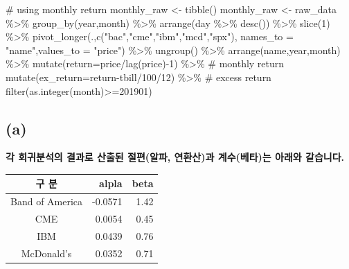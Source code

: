 \documentclass[
  a4paper,
  DIV=11,
  numbers=noendperiod]{scrreprt}
\newenvironment{Shaded}{\begin{snugshade}}{\end{snugshade}}
\newcommand{\AttributeTok}[1]{\textcolor[rgb]{0.40,0.45,0.13}{#1}}
\newcommand{\CommentTok}[1]{\textcolor[rgb]{0.37,0.37,0.37}{#1}}
\newcommand{\DecValTok}[1]{\textcolor[rgb]{0.68,0.00,0.00}{#1}}
\newcommand{\FunctionTok}[1]{\textcolor[rgb]{0.28,0.35,0.67}{#1}}
\newcommand{\NormalTok}[1]{\textcolor[rgb]{0.00,0.23,0.31}{#1}}
\newcommand{\OtherTok}[1]{\textcolor[rgb]{0.00,0.23,0.31}{#1}}
\newcommand{\SpecialCharTok}[1]{\textcolor[rgb]{0.37,0.37,0.37}{#1}}
\newcommand{\StringTok}[1]{\textcolor[rgb]{0.13,0.47,0.30}{#1}}
\begin{document}
\begin{Shaded}
\begin{Highlighting}[]
\CommentTok{\# using monthly return}
\NormalTok{monthly\_raw }\OtherTok{\textless{}{-}} \FunctionTok{tibble}\NormalTok{()}
\NormalTok{monthly\_raw }\OtherTok{\textless{}{-}}\NormalTok{ raw\_data }\SpecialCharTok{\%\textgreater{}\%} 
  \FunctionTok{group\_by}\NormalTok{(year,month) }\SpecialCharTok{\%\textgreater{}\%} 
  \FunctionTok{arrange}\NormalTok{(day }\SpecialCharTok{\%\textgreater{}\%} \FunctionTok{desc}\NormalTok{()) }\SpecialCharTok{\%\textgreater{}\%} 
  \FunctionTok{slice}\NormalTok{(}\DecValTok{1}\NormalTok{) }\SpecialCharTok{\%\textgreater{}\%} 
  \FunctionTok{pivot\_longer}\NormalTok{(.,}\FunctionTok{c}\NormalTok{(}\StringTok{"bac"}\NormalTok{,}\StringTok{"cme"}\NormalTok{,}\StringTok{"ibm"}\NormalTok{,}\StringTok{"mcd"}\NormalTok{,}\StringTok{"spx"}\NormalTok{),}
               \AttributeTok{names\_to =} \StringTok{"name"}\NormalTok{,}\AttributeTok{values\_to =} \StringTok{"price"}\NormalTok{) }\SpecialCharTok{\%\textgreater{}\%} 
  \FunctionTok{ungroup}\NormalTok{() }\SpecialCharTok{\%\textgreater{}\%} 
  \FunctionTok{arrange}\NormalTok{(name,year,month) }\SpecialCharTok{\%\textgreater{}\%} 
  \FunctionTok{mutate}\NormalTok{(}\AttributeTok{return=}\NormalTok{price}\SpecialCharTok{/}\FunctionTok{lag}\NormalTok{(price)}\SpecialCharTok{{-}}\DecValTok{1}\NormalTok{) }\SpecialCharTok{\%\textgreater{}\%}  \CommentTok{\# monthly return}
  \FunctionTok{mutate}\NormalTok{(}\AttributeTok{ex\_return=}\NormalTok{return}\SpecialCharTok{{-}}\NormalTok{tbill}\SpecialCharTok{/}\DecValTok{100}\SpecialCharTok{/}\DecValTok{12}\NormalTok{) }\SpecialCharTok{\%\textgreater{}\%} \CommentTok{\# excess return}
  \FunctionTok{filter}\NormalTok{(}\FunctionTok{as.integer}\NormalTok{(month)}\SpecialCharTok{\textgreater{}=}\DecValTok{201901}\NormalTok{)}
\end{Highlighting}
\end{Shaded}

\subsection*{(a)}\label{a}

\textbf{각 회귀분석의 결과로 산출된 절편(알파, 연환산)과 계수(베타)는
아래와 같습니다.}

\begin{longtable}[]{@{}crr@{}}
\toprule\noalign{}
구 분 & alpla & beta \\
\midrule\noalign{}
\endhead
\bottomrule\noalign{}
\endlastfoot
Band of America & -0.0571 & 1.42 \\
CME & 0.0054 & 0.45 \\
IBM & 0.0439 & 0.76 \\
McDonald's & 0.0352 & 0.71 \\
\end{longtable}
\end{document}
